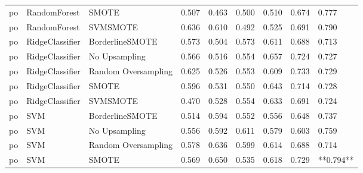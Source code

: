 \begin{tabular}{lllllllll}
      po &                 RandomForest &               SMOTE & 0.507 &                     0.463 &                 0.500 &                  0.510 &                                   0.674 &     0.777 \\
      po &                 RandomForest &            SVMSMOTE & 0.636 &                     0.610 &                 0.492 &                  0.525 &                                   0.691 &     0.790 \\
      po &              RidgeClassifier &     BorderlineSMOTE & 0.573 &                     0.504 &                 0.573 &                  0.611 &                                   0.688 &     0.713 \\
      po &              RidgeClassifier &       No Upsampling & 0.566 &                     0.516 &                 0.554 &                  0.657 &                                   0.724 &     0.727 \\
      po &              RidgeClassifier & Random Oversampling & 0.625 &                     0.526 &                 0.553 &                  0.609 &                                   0.733 &     0.729 \\
      po &              RidgeClassifier &               SMOTE & 0.596 &                     0.531 &                 0.550 &                  0.643 &                                   0.714 &     0.728 \\
      po &              RidgeClassifier &            SVMSMOTE & 0.470 &                     0.528 &                 0.554 &                  0.633 &                                   0.691 &     0.724 \\
      po &                          SVM &     BorderlineSMOTE & 0.514 &                     0.594 &                 0.552 &                  0.556 &                                   0.648 &     0.737 \\
      po &                          SVM &       No Upsampling & 0.556 &                     0.592 &                 0.611 &                  0.579 &                                   0.603 &     0.759 \\
      po &                          SVM & Random Oversampling & 0.578 &                     0.636 &                 0.599 &                  0.614 &                                   0.688 &     0.714 \\
      po &                          SVM &               SMOTE & 0.569 &                     0.650 &                 0.535 &                  0.618 &                                   0.729 & **0.794** \\

\end{tabular}
